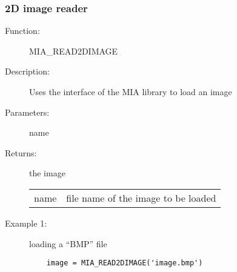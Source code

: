 \subsubsection*{2D image reader}

\begin{description}
\item [Function:] MIA\_READ2DIMAGE
\item [Description:] Uses the interface of the MIA library to load an image
\item [Parameters:] name
\item [Returns:] the image

\begin{tabular}{ll}
name  & file name of the image to be loaded \\
\end{tabular}
\item [Example 1:] loading a ``BMP'' file 
\begin{lstlisting}
    image = MIA_READ2DIMAGE('image.bmp')
\end{lstlisting}
\end{description}



